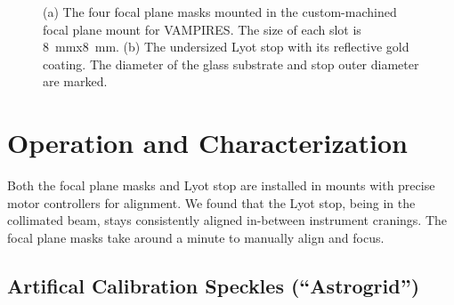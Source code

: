 \documentclass[]{spie}  %
\begin{document}
\begin{figure}
   \centering
   \hspace{0.5in}
   \caption{(a) The four focal plane masks mounted in the custom-machined focal plane mount for VAMPIRES. The size of each slot is \qty{8}{\milli\meter}x\qty{8}{\milli\meter}. (b) The undersized Lyot stop with its reflective gold coating. The diameter of the glass substrate and stop outer diameter are marked.}\label{fig:optics}
\end{figure}

\section{Operation and Characterization}\label{sec:tests}

Both the focal plane masks and Lyot stop are installed in mounts with precise motor controllers for alignment. We found that the Lyot stop, being in the collimated beam, stays consistently aligned in-between instrument cranings. The focal plane masks take around a minute to manually align and focus.

\subsection{Artifical Calibration Speckles (``Astrogrid'')}
\end{document}
